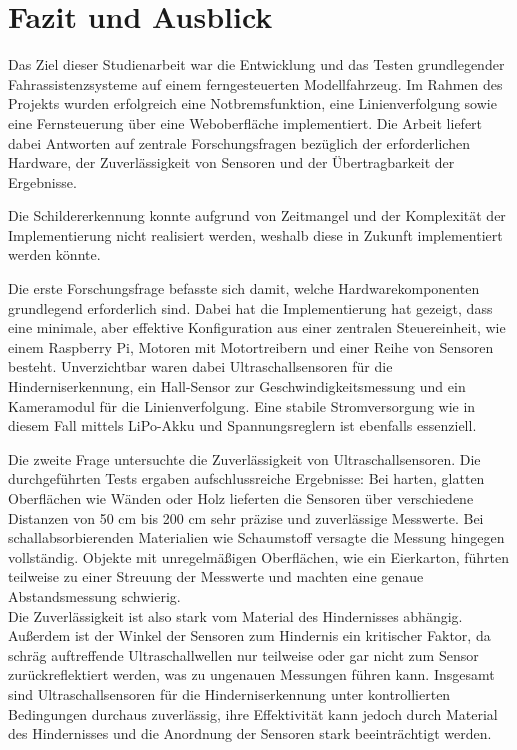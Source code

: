 \chapter{Fazit und Ausblick}
\label{fazit}

Das Ziel dieser Studienarbeit war die Entwicklung und das Testen grundlegender Fahrassistenzsysteme auf einem ferngesteuerten Modellfahrzeug. Im Rahmen des Projekts wurden erfolgreich eine Notbremsfunktion, eine Linienverfolgung sowie eine Fernsteuerung über eine Weboberfläche implementiert. Die Arbeit liefert dabei Antworten auf zentrale Forschungsfragen bezüglich der erforderlichen Hardware, der Zuverlässigkeit von Sensoren und der Übertragbarkeit der Ergebnisse. 

Die Schildererkennung konnte aufgrund von Zeitmangel und der Komplexität der Implementierung nicht realisiert werden, weshalb diese in Zukunft implementiert werden könnte.

Die erste Forschungsfrage befasste sich damit, welche Hardwarekomponenten grundlegend erforderlich sind. Dabei hat die Implementierung hat gezeigt, dass eine minimale, aber effektive Konfiguration aus einer zentralen Steuereinheit, wie einem Raspberry Pi, Motoren mit Motortreibern und einer Reihe von Sensoren besteht. Unverzichtbar waren dabei Ultraschallsensoren für die Hinderniserkennung, ein Hall-Sensor zur Geschwindigkeitsmessung und ein Kameramodul für die Linienverfolgung. Eine stabile Stromversorgung wie in diesem Fall mittels \ac{LiPo}-Akku und Spannungsreglern ist ebenfalls essenziell.

Die zweite Frage untersuchte die Zuverlässigkeit von Ultraschallsensoren. Die durchgeführten Tests ergaben aufschlussreiche Ergebnisse: Bei harten, glatten Oberflächen wie Wänden oder Holz lieferten die Sensoren über verschiedene Distanzen von 50 cm bis 200 cm sehr präzise und zuverlässige Messwerte. Bei schallabsorbierenden Materialien wie Schaumstoff versagte die Messung hingegen vollständig. Objekte mit unregelmäßigen Oberflächen, wie ein Eierkarton, führten teilweise zu einer Streuung der Messwerte und machten eine genaue Abstandsmessung schwierig. \\
Die Zuverlässigkeit ist also stark vom Material des Hindernisses abhängig. Außerdem ist der Winkel der Sensoren zum Hindernis ein kritischer Faktor, da schräg auftreffende Ultraschallwellen nur teilweise oder gar nicht zum Sensor zurückreflektiert werden, was zu ungenauen Messungen führen kann. Insgesamt sind Ultraschallsensoren für die Hinderniserkennung unter kontrollierten Bedingungen durchaus zuverlässig, ihre Effektivität kann jedoch durch Material des Hindernisses und die Anordnung der Sensoren stark beeinträchtigt werden. 

